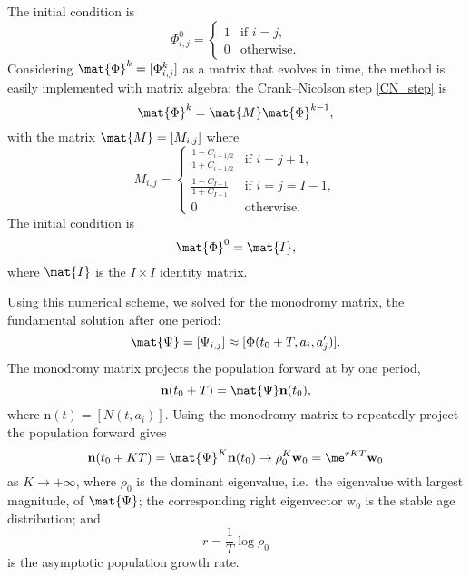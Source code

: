 \documentclass{jpmarticle}
\renewcommand{\vec}[1]{\boldsymbol{\mathrm{#1}}}
\begin{document}
The initial condition is
\begin{equation}
  \Phi_{i, j}^0 =
  \begin{cases}
    1 & \text{if $i = j$}, \\
    0 & \text{otherwise}.
  \end{cases}
\end{equation}
Considering $\mat{\Phi}^k = [\Phi_{i, j}^k]$ as a matrix that
evolves in time, the method is easily implemented with matrix algebra:
the Crank--Nicolson step \eqref{CN_step} is
\begin{equation}
  \mat{\Phi}^k = \mat{M} \mat{\Phi}^{k - 1},
\end{equation}
with the matrix $\mat{M} = [M_{i, j}]$ where
\begin{equation}
  M_{i, j} =
  \begin{cases}
    \frac{1 - C_{i - 1 / 2}}{1 + C_{i - 1 / 2}}
    & \text{if $i = j + 1$}, \\
    \frac{1 - C_{I - 1}}{1 + C_{I - 1}} & \text{if $i = j = I - 1$}, \\
    0 & \text{otherwise}.
  \end{cases}
\end{equation}
The initial condition is
\begin{equation}
  \mat{\Phi}^0 = \mat{I},
\end{equation}
where $\mat{I}$ is the $I \times I$ identity matrix.

Using this numerical scheme, we solved for the monodromy matrix, the
fundamental solution after one period:
\begin{equation}
  \mat{\Psi} = [\Psi_{i, j}] \approx [\Phi(t_0 + T, a_i, a'_j)].
\end{equation}
The monodromy matrix projects the population forward at by one period,
\begin{equation}
  \vec{n}(t_0 + T) = \mat{\Psi} \vec{n}(t_0),
\end{equation}
where $\vec{n}(t) = [N(t, a_i)]$.
Using the monodromy matrix to repeatedly project the population
forward gives
\begin{equation}
  \vec{n}(t_0 + K T)
  = \mat{\Psi}^K \vec{n}(t_0)
  \to \rho_0^K \vec{w}_0
  = \me^{r K T} \vec{w}_0
\end{equation}
as $K \to +\infty$,
where $\rho_0$ is the dominant eigenvalue, i.e.~the eigenvalue with
largest magnitude, of $\mat{\Psi}$;
the corresponding right eigenvector $\vec{w}_0$ is the stable age
distribution; and
\begin{equation}
  r = \frac{1}{T} \log \rho_0
\end{equation}
is the asymptotic population growth rate.
\end{document}
